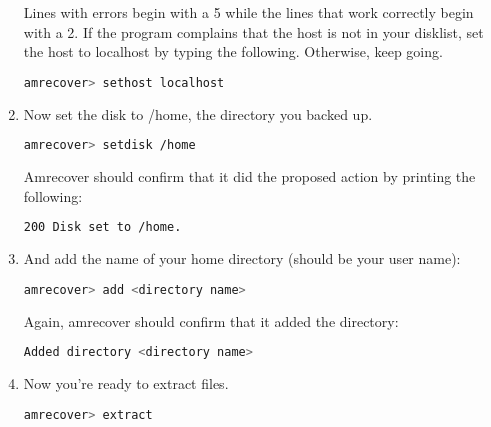\documentclass{article}
\begin{document}
\begin{enumerate}
Lines with errors begin with a 5 while the lines that work correctly begin with a 2. If the program complains that the host is not in your disklist, set the host to localhost by typing the following. Otherwise, keep going.

\begin{lstlisting}[basicstyle=\ttfamily, backgroundcolor = \color{lightgray}, language = bash, xleftmargin = 0cm, framexleftmargin = 1em]
amrecover> sethost localhost
\end{lstlisting}

\item Now set the disk to /home, the directory you backed up.

\begin{lstlisting}[basicstyle=\ttfamily, backgroundcolor = \color{lightgray}, language = bash, xleftmargin = 0cm, framexleftmargin = 1em]
amrecover> setdisk /home
\end{lstlisting}

Amrecover should confirm that it did the proposed action by printing the following:

\begin{lstlisting}[basicstyle=\ttfamily, backgroundcolor = \color{lightgray}, language = bash, xleftmargin = 0cm, framexleftmargin = 1em]
200 Disk set to /home.
\end{lstlisting}

\item And add the name of your home directory (should be your user name):

\begin{lstlisting}[basicstyle=\ttfamily, backgroundcolor = \color{lightgray}, language = bash, xleftmargin = 0cm, framexleftmargin = 1em]
amrecover> add <directory name>
\end{lstlisting}

Again, amrecover should confirm that it added the directory:

\begin{lstlisting}[basicstyle=\ttfamily, backgroundcolor = \color{lightgray}, language = bash, xleftmargin = 0cm, framexleftmargin = 1em]
Added directory <directory name>
\end{lstlisting}

\item Now you're ready to extract files.

\begin{lstlisting}[basicstyle=\ttfamily, backgroundcolor = \color{lightgray}, language = bash, xleftmargin = 0cm, framexleftmargin = 1em]
amrecover> extract
\end{lstlisting}


\end{enumerate}
\end{document}

